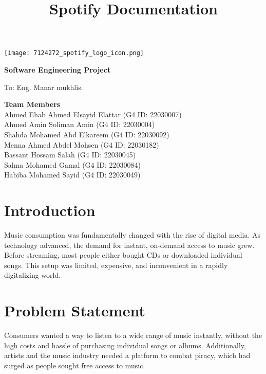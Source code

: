 \documentclass[a4paper,10pt]{article}
\title{\Huge \textbf{Spotify Documentation}}
\date{}
\begin{document}
\begin{titlepage}
    \centering
    \vspace*{2cm}

    \vspace{1cm}
    \texttt{[image: 7124272\_spotify\_logo\_icon.png]}

    \vspace{1cm}
    \Huge
    \textbf{Software Engineering Project}

    \vspace{1cm}
    \LARGE
    To: Eng. Manar mukhlis.

    \vfill
    
    \Large
    \textbf{Team Members} \\
    Ahmed Ehab Ahmed Elsayid Elattar (G4 ID: 22030007) \\
    Ahmed Amin Soliman Amin (G4 ID: 22030004) \\
    Shahda Mohamed Abd Elkareem (G4 ID: 22030092) \\
    Menna Ahmed Abdel Mohsen (G4 ID: 22030182) \\
    Bassant Hossam Salah (G4 ID: 22030045) \\
    Salma Mohamed Gamal (G4 ID: 22030084) \\
    Habiba Mohamed Sayid (G4 ID: 22030049)

    \vspace{2cm}
\end{titlepage}

\newpage
\tableofcontents
\newpage

\section{Introduction}
Music consumption was fundamentally changed with the rise of digital media. As technology advanced, the demand for instant, on-demand access to music grew. Before streaming, most people either bought CDs or downloaded individual songs. This setup was limited, expensive, and inconvenient in a rapidly digitalizing world.

\section{Problem Statement}
Consumers wanted a way to listen to a wide range of music instantly, without the high costs and hassle of purchasing individual songs or albums. Additionally, artists and the music industry needed a platform to combat piracy, which had surged as people sought free access to music.
\end{document}
